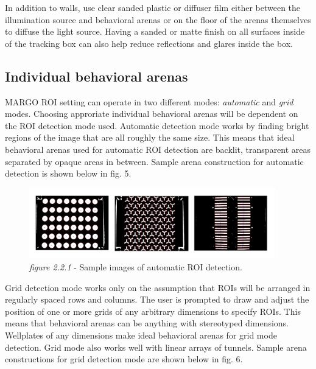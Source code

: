 \documentclass[11pt]{article}
\begin{document}
In addition to walls, use clear sanded plastic or diffuser film either between the illumination source and behavioral arenas or on the floor of the arenas themselves to diffuse the light source. Having a sanded or matte finish on all surfaces inside of the tracking box can also help reduce reflections and glares inside the box.


\hypertarget{arenasection}{\subsection{Individual behavioral arenas}}

MARGO ROI setting can operate in two different modes: \textit{automatic} and \textit{grid} modes. Choosing approriate individual behavioral arenas will be dependent on the  ROI detection mode used. Automatic detection mode works by finding bright regions of the image that are all roughly the same size. This means that ideal behavioral arenas used for automatic ROI detection are backlit, transparent areas separated by opaque areas in between. Sample arena construction for automatic detection is shown below in fig. 5.

\begin{figure}[h!]
	\begin{center}
		\includegraphics[width=0.95\textwidth]{images/Hardware Setup/Behavioral Arenas/autoROI_detection.pdf}
		\caption*{\footnotesize {\textit{figure 2.2.1} - Sample images of automatic ROI detection.}}
	\end{center}
\end{figure}

Grid detection mode works only on the assumption that ROIs will be arranged in regularly spaced rows and columns. The user is prompted to draw and adjust the position of one or more grids of any arbitrary dimensions to specify ROIs. This means that behavioral arenas can be anything with stereotyped dimensions. Wellplates of any dimensions make ideal behavioral arenas for grid mode detection. Grid mode also works well with linear arrays of tunnels. Sample arena constructions for grid detection mode are shown below in fig. 6.
\end{document}
